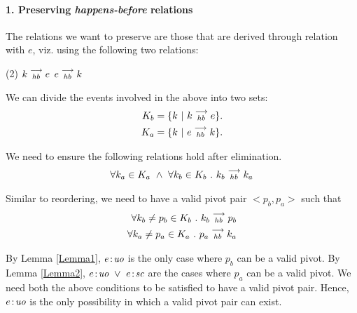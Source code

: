 \paragraph{1. Preserving \emph{happens-before} relations}
        The relations we want to preserve are those that are derived through relation with $e$, viz. using the following two relations:
        \begin{tasks}(2)
            \task $k\stackrel{\longrightarrow}{_{hb}}e$
            \task $e\stackrel{\longrightarrow}{_{hb}}k$
        \end{tasks}

        We can divide the events involved in the above into two sets:
        \begin{align*}
            K_b = \{k \ | \ k\stackrel{\longrightarrow}{_{hb}}e \}. \\
            K_a = \{k \ | \ e\stackrel{\longrightarrow}{_{hb}}k \}. 
        \end{align*}

        We need to ensure the following relations hold after elimination.
        \begin{align*}
            \forall k_a \in K_a \ \wedge \ \forall k_b \in K_b \ . \ \reln{k_b}{hb}{k_a}
        \end{align*}

        Similar to reordering, we need to have a valid pivot pair $<p_b, p_a>$ such that 
        \begin{align*}
            \forall k_b \neq p_b \in K_b \ . \ k_b\stackrel{\longrightarrow}{_{hb}}p_b \\
            \forall k_a \neq p_a \in K_a \ . \ p_a\stackrel{\longrightarrow}{_{hb}}k_a 
        \end{align*}

        By Lemma \ref{Lemma1}, $e\!:\!\textit{uo}$ is the only case where $p_b$ can be a valid pivot. 
        By Lemma \ref{Lemma2}, $e\!:\!\textit{uo} \ \vee \ e\!:\!\textit{sc}$ are the cases where $p_a$ can be a valid pivot. 
        We need both the above conditions to be satisfied to have a valid pivot pair. 
        Hence, $e\!:\!\textit{uo}$ is the only possibility in which a valid pivot pair can exist. 

